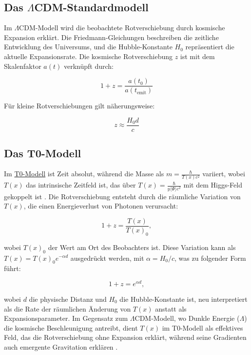 \documentclass[a4paper,12pt]{article}
\theoremstyle{definition}
\theoremstyle{remark}
\newcommand{\Tfield}{T(x)}
\newcommand{\repobase}{https://github.com/jpascher/T0-Time-Mass-Duality/tree/main/2/}
\begin{document}
	\subsection{Das \(\Lambda\)CDM-Standardmodell}
	
	Im \(\Lambda\)CDM-Modell wird die beobachtete Rotverschiebung durch kosmische Expansion erklärt. Die Friedmann-Gleichungen beschreiben die zeitliche Entwicklung des Universums, und die Hubble-Konstante $H_0$ repräsentiert die aktuelle Expansionsrate. Die kosmische Rotverschiebung $z$ ist mit dem Skalenfaktor $a(t)$ verknüpft durch:
	
	\begin{equation}
		1 + z = \frac{a(t_0)}{a(t_{\text{emit}})}
	\end{equation}
	
	Für kleine Rotverschiebungen gilt näherungsweise:
	
	\begin{equation}
		z \approx \frac{H_0 d}{c}
	\end{equation}
	
	\subsection{Das T0-Modell}
	
	Im {\small\href{\repobase/pdf/Deutsch/Wesentliche mathematische Formalismen der Zeit-Masse-Dualitätstheorie mit Lagrange-Dichten_de.pdf}{T0-Modell}} ist Zeit absolut, während die Masse als \( m = \frac{\hbar}{\Tfield c^2} \) variiert, wobei \( \Tfield \) das intrinsische Zeitfeld ist, das über \( \Tfield = \frac{\hbar}{y \langle \Phi \rangle c^2} \) mit dem Higgs-Feld gekoppelt ist \cite{pascher_galaxies_2025}. Die Rotverschiebung entsteht durch die räumliche Variation von \( \Tfield \), die einen Energieverlust von Photonen verursacht:
	
	\begin{equation}
		1 + z = \frac{\Tfield}{\Tfield_0},
	\end{equation}
	
	wobei \( \Tfield_0 \) der Wert am Ort des Beobachters ist. Diese Variation kann als \( \Tfield = \Tfield_0 e^{-\alpha d} \) ausgedrückt werden, mit \( \alpha = H_0/c \), was zu folgender Form führt:
	
	\begin{equation}
		1 + z = e^{\alpha d},
	\end{equation}
	
	wobei \( d \) die physische Distanz und \( H_0 \) die Hubble-Konstante ist, neu interpretiert als die Rate der räumlichen Änderung von \( \Tfield \) anstatt als Expansionsparameter. Im Gegensatz zum \(\Lambda\)CDM-Modell, wo Dunkle Energie (\(\Lambda\)) die kosmische Beschleunigung antreibt, dient \( \Tfield \) im T0-Modell als effektives Feld, das die Rotverschiebung ohne Expansion erklärt, während seine Gradienten auch emergente Gravitation erklären \cite{pascher_galaxies_2025}.
	
\end{document}

